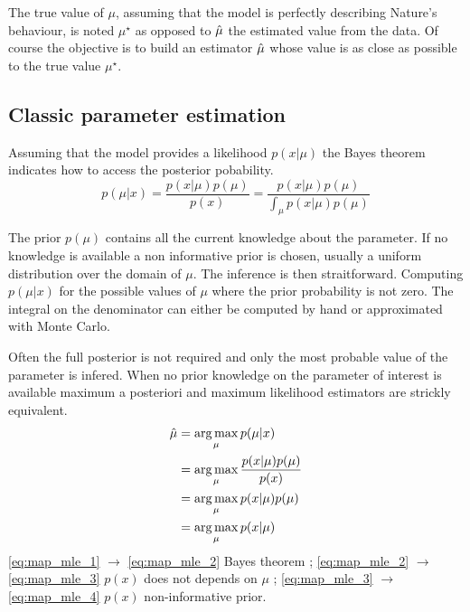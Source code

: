The true value of $\mu$, assuming that the model is perfectly describing Nature's behaviour, is noted $\mu^\star$ as opposed to $\hat\mu$ the estimated value from the data.
Of course the objective is to build an estimator $\hat\mu$ whose value is as close as possible to the true value $\mu^\star$.







\subsection{Classic parameter estimation} %
\label{sub:classic_parameter_estimation}



Assuming that the model provides a likelihood $p(x | \mu)$ the Bayes theorem indicates how to access the posterior pobability.
\begin{equation}	
    p(\mu | x) = \frac{p(x|\mu) p(\mu)}{p(x)} = \frac{p(x|\mu) p(\mu)}{\int_\mu p(x|\mu) p(\mu)}
\end{equation}

The prior $p(\mu)$ contains all the current knowledge about the parameter. 
If no knowledge is available a non informative prior is chosen, usually a uniform distribution over the domain of $\mu$.
The inference is then straitforward.
Computing $p(\mu | x)$ for the possible values of $\mu$ \ie where the prior probability is not zero.
The integral on the denominator can either be computed by hand or approximated with Monte Carlo.

Often the full posterior is not required and only the most probable value of the parameter is infered.
When no prior knowledge on the parameter of interest is available maximum a posteriori and maximum likelihood estimators are strickly equivalent.
\begin{align}
	\label{eq:map_mle_1}
	\hat\mu &= \operatorname*{arg\,max}_\mu p(\mu | x) \\
	\label{eq:map_mle_2}
		&= \operatorname*{arg\,max}_\mu \frac{p(x|\mu) p(\mu)}{p(x)} \\
	\label{eq:map_mle_3}
		&= \operatorname*{arg\,max}_\mu p(x|\mu) p(\mu) \\
	\label{eq:map_mle_4}
		&= \operatorname*{arg\,max}_\mu p(x|\mu)\\
\end{align}
\autoref{eq:map_mle_1} $ \to$ \autoref{eq:map_mle_2} Bayes theorem ;
\autoref{eq:map_mle_2} $ \to$ \autoref{eq:map_mle_3} $p(x)$ does not depends on $\mu$ ;
\autoref{eq:map_mle_3} $ \to$ \autoref{eq:map_mle_4} $p(x)$ non-informative prior.

